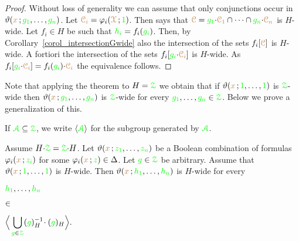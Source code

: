 \begin{proof}
  Without loss of generality we can assume that only conjunctions occur in $\vartheta({\color{brown} x}\,;{\color{green} g_1},\dots,{\color{green} g_n})$.
  Let ${\color{brown}\EuScript C_i}=\varphi_i({\color{brown}\EuScript X}\,;{\color{green} 1})$.
  Then  says that ${\color{brown}\EuScript C}={\color{green} g_1}{\cdot}{\color{brown}\EuScript C_1}\cap\dots\cap{\color{green}g_n}{\cdot}{\color{brown}\EuScript C_n}$ is $H$-wide.
  Let $f_i\in H$ be such that ${\color{green} h_i}=f_i({\color{green} g_i})$.
  Then, by Corollary~\ref{corol_intersectionGwide} also the intersection of the sets $f_i[{\color{brown}\EuScript C}]$ is $H$-wide.
  A fortiori the intersection of the sets $f_i[{\color{green} g_i}{\cdot}{\color{brown}\EuScript C_i}]$ is $H$-wide.
  As $f_i[{\color{green} g_i}{\cdot}{\color{brown}\EuScript C_i}]=f_i({\color{green} g_i}){\cdot}{\color{brown}\EuScript C_i}$ the equivalence follows.
\end{proof}

Note that applying the theorem to  $H={\color{green}\EuScript Z}$ we obtain that if $\vartheta({\color{brown} x}\,;{\color{green} 1},\dots,{\color{green} 1})$ is ${\color{green}\EuScript Z}$-wide then $\vartheta({\color{brown} x}\,;{\color{green} g_1},\dots,{\color{green} g_n})$ is ${\color{green}\EuScript Z}$-wide for every ${\color{green} g_1},\dots,{\color{green} g_n}\in{\color{green}\EuScript Z}$.
Below we prove a generalization of this. 

If ${\color{green}\EuScript A}\subseteq{\color{green}\EuScript Z}$, we write \emph{$\langle{\color{green}\EuScript A}\rangle$} for the subgroup generated by ${\color{green}\EuScript A}$.

\begin{proposition}\label{prop_stabilizer1}
  \def\medrel#1{\parbox[t]{5ex}{$\displaystyle\hfil #1$}}
  \def\ceq#1#2#3{\parbox[t]{15ex}{$\displaystyle #1$}\medrel{#2}{$\displaystyle #3$}}
  Assume $H{\cdot}{\color{green}\EuScript Z}={\color{green}\EuScript Z}{\cdot}H$.
   Let $\vartheta({\color{brown} x}\,;{\color{green} z_1},\dots,{\color{green} z_n})$ be a Boolean combination of formulas $\varphi_i({\color{brown} x}\,;{\color{green} z_i})$ for some $\varphi_i({\color{brown} x}\,;{\color{green} z})\in\Delta$.
  Let ${\color{green} g}\in{\color{green}\EuScript Z}$ be arbitrary.
  Assume that $\vartheta({\color{brown} x}\,;{\color{green} 1},\dots,{\color{green} 1})$ is $H$-wide.
  Then $\vartheta({\color{brown} x}\,;{\color{green} h_1},\dots,{\color{green} h_n})$ is $H$-wide for every 
  
  \ceq{\hfill{\gr h_1},\dots,{\gr h_n}}{\in}{\Big\<\bigcup_{{\gr g}\in\grZ}({\gr g})_H^{-1}\!\cdot({\gr g})_H\Big\>.}
\end{proposition}


